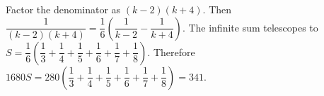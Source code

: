 Factor the denominator as $(k-2)(k+4)$. Then $\dfrac{1}{(k-2)(k+4)}=\dfrac{1}{6}\left(\dfrac{1}{k-2}-\dfrac{1}{k+4}\right)$. The infinite sum telescopes to $S=\dfrac{1}{6}\left(\dfrac{1}{3}+\dfrac{1}{4}+\dfrac{1}{5}+\dfrac{1}{6}+\dfrac{1}{7}+\dfrac{1}{8}\right)$. Therefore $1680S=280\left(\dfrac{1}{3}+\dfrac{1}{4}+\dfrac{1}{5}+\dfrac{1}{6}+\dfrac{1}{7}+\dfrac{1}{8}\right)=\boxed{341}$.

